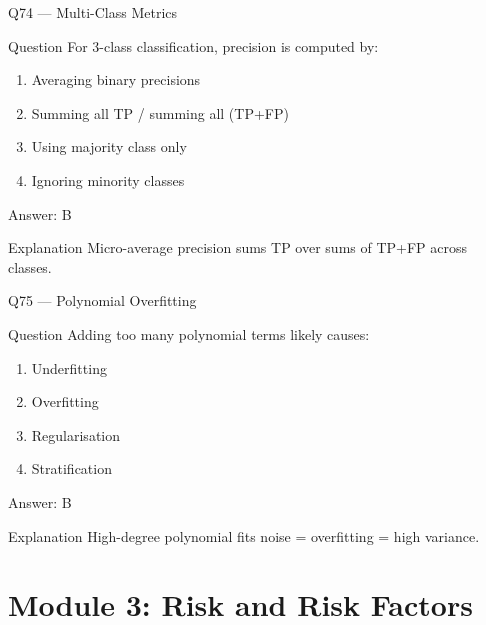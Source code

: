 \documentclass[aspectratio=169,8pt]{beamer}
\begin{document}
	\begin{frame}{Q74 --- Multi-Class Metrics}
		\begin{block}{Question}
			For 3-class classification, precision is computed by:
		\end{block}
		\begin{enumerate}
			\item Averaging binary precisions
			\item Summing all TP / summing all (TP+FP)
			\item Using majority class only
			\item Ignoring minority classes
		\end{enumerate}
		\begin{exampleblock}{Answer: B}\end{exampleblock}
		\begin{block}{Explanation}
			Micro-average precision sums TP over sums of TP+FP across classes.
		\end{block}
	\end{frame}
	
	\begin{frame}{Q75 --- Polynomial Overfitting}
		\begin{block}{Question}
			Adding too many polynomial terms likely causes:
		\end{block}
		\begin{enumerate}
			\item Underfitting
			\item Overfitting
			\item Regularisation
			\item Stratification
		\end{enumerate}
		\begin{exampleblock}{Answer: B}\end{exampleblock}
		\begin{block}{Explanation}
			High-degree polynomial fits noise = overfitting = high variance.
		\end{block}
	\end{frame}
	
	\section{Module 3: Risk and Risk Factors}
	
\end{document}
